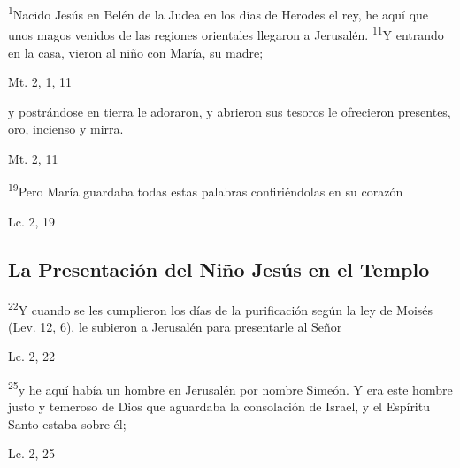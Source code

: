 \documentclass[a4paper,11pt,sans]{article}
\begin{document}
      \begin{center}
        \textsuperscript{1}Nacido Jesús en Belén de la Judea en los días de Herodes el rey, he aquí que unos magos venidos de las regiones orientales llegaron a Jerusalén.
        \textsuperscript{11}Y entrando en la casa, vieron al niño con María, su madre;
      \end{center}

      \begin{center}
        Mt. 2, 1, 11        
      \end{center}
      
      \begin{center}
        y postrándose en tierra le adoraron, y abrieron sus tesoros le ofrecieron presentes, oro, incienso y mirra.
      \end{center}

      \begin{center}
        Mt. 2, 11         
      \end{center}      
      
      \begin{center}
        \textsuperscript{19}Pero María guardaba todas estas palabras confiriéndolas en su corazón
      \end{center}
      \begin{center}
        Lc. 2, 19        
      \end{center}
            
    \subsection*{\hfil La Presentación del Niño Jesús en el Templo \hfil}
      
      \begin{center}
        \textsuperscript{22}Y cuando se les cumplieron los días de la purificación según la ley de Moisés (Lev. 12, 6), le subieron a Jerusalén para presentarle al Señor
      \end{center}
      \begin{center}
        Lc. 2, 22         
      \end{center}
      
      \begin{center}
        \textsuperscript{25}y he aquí había un hombre en Jerusalén por nombre Simeón. Y era este hombre justo y temeroso de Dios que aguardaba la consolación de Israel, 
        y el Espíritu Santo estaba sobre él;
      \end{center}
      \begin{center}
        Lc. 2, 25         
      \end{center}
      
\end{document}
